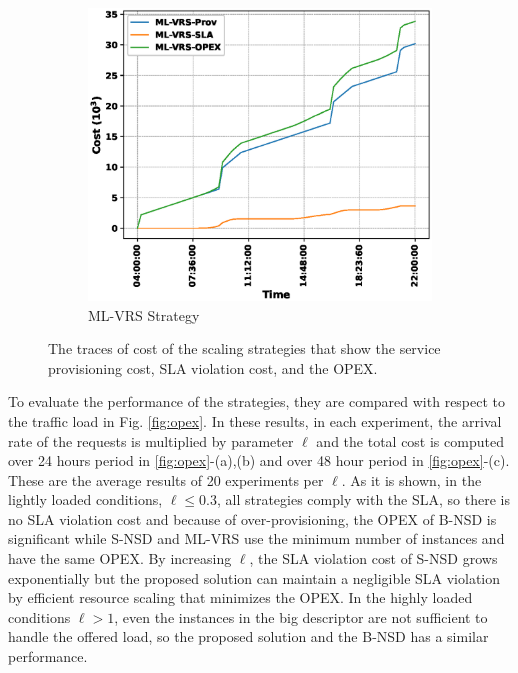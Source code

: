 \documentclass[conference, final]{IEEEtran}
\begin{document}
{\begin{figure}
\hfill
\begin{subfigure}[h]{0.32\linewidth}
\includegraphics[width=\linewidth]{./figures/ML-VRScost_trace.eps}
\caption{{\textsf{ML-VRS}} Strategy}
\end{subfigure}
\caption{The traces of cost of the scaling strategies that show the service provisioning cost, SLA violation cost, and the OPEX.}
\label{fig:cost_trace}
\end{figure}

To evaluate the performance of the strategies, they are compared with respect to the traffic load in Fig. \ref{fig:opex}. In these results, in each experiment, the arrival rate of the requests is multiplied by parameter $\ell$ and the total cost is computed over 24 hours period in \ref{fig:opex}-(a),(b) and over 48 hour period in \ref{fig:opex}-(c). These are the average results of 20 experiments per $\ell$. As it is shown, in the lightly loaded conditions, $\ell \leq 0.3$, all strategies comply with the SLA, so there is no SLA violation cost and because of over-provisioning, the OPEX of {\small \textsf{B-NSD}} is significant while {\small \textsf{S-NSD}} and {\small \textsf{ML-VRS}} use the minimum number of instances and have the same OPEX. By increasing $\ell$, the SLA violation cost of {\small \textsf{S-NSD}} grows exponentially but the proposed solution can maintain a negligible SLA violation by efficient resource scaling that minimizes the OPEX. In the highly loaded conditions $\ell > 1$, even the instances in the big descriptor are not sufficient to handle the offered load, so the proposed solution and the {\small \textsf{B-NSD}} has a similar performance.

}
\end{document}
